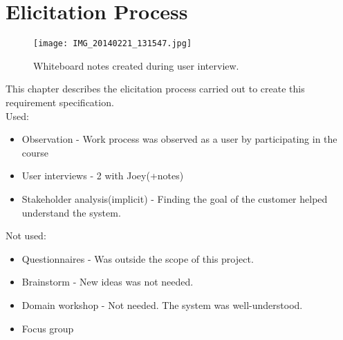 \documentclass[Main]{subfiles}
\begin{document}
\chapter{Elicitation Process}\label{cha:Elicitation}

\begin{wrapfigure}{r}{0.5\textwidth}
\begin{center}
\texttt{[image: IMG\_20140221\_131547.jpg]}
\end{center}
\caption{Whiteboard notes created during user interview.}
\label{fig:UserInterviewNotes}
\end{wrapfigure}

This chapter describes the elicitation process carried out to create this requirement specification. \\



Used:
\begin{itemize}
\item Observation - Work process was observed as a user by participating in the course
\item User interviews - 2 with Joey(+notes)
\item Stakeholder analysis(implicit) - Finding the goal of the customer helped understand the system.
\end{itemize}


Not used:
\begin{itemize}
\item Questionnaires - Was outside the scope of this project.
\item Brainstorm - New ideas was not needed.
\item Domain workshop - Not needed. The system was well-understood.
\item Focus group
\end{itemize}
\end{document}
